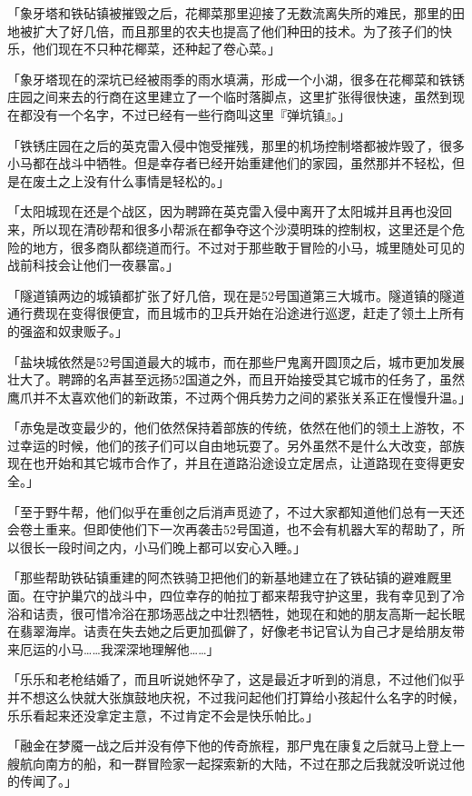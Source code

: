 {「象牙塔和铁砧镇被摧毁之后，花椰菜那里迎接了无数流离失所的难民，那里的田地被扩大了好几倍，而且那里的农夫也提高了他们种田的技术。为了孩子们的快乐，他们现在不只种花椰菜，还种起了卷心菜。」

「象牙塔现在的深坑已经被雨季的雨水填满，形成一个小湖，很多在花椰菜和铁锈庄园之间来去的行商在这里建立了一个临时落脚点，这里扩张得很快速，虽然到现在都没有一个名字，不过已经有一些行商叫这里『弹坑镇』。」

「铁锈庄园在之后的英克雷入侵中饱受摧残，那里的机场控制塔都被炸毁了，很多小马都在战斗中牺牲。但是幸存者已经开始重建他们的家园，虽然那并不轻松，但是在废土之上没有什么事情是轻松的。」

「太阳城现在还是个战区，因为聘蹄在英克雷入侵中离开了太阳城并且再也没回来，所以现在清砂帮和很多小帮派在都争夺这个沙漠明珠的控制权，这里还是个危险的地方，很多商队都绕道而行。不过对于那些敢于冒险的小马，城里随处可见的战前科技会让他们一夜暴富。」

「隧道镇两边的城镇都扩张了好几倍，现在是52号国道第三大城市。隧道镇的隧道通行费现在变得很便宜，而且城市的卫兵开始在沿途进行巡逻，赶走了领土上所有的强盗和奴隶贩子。」

「盐块城依然是52号国道最大的城市，而在那些尸鬼离开圆顶之后，城市更加发展壮大了。聘蹄的名声甚至远扬52国道之外，而且开始接受其它城市的任务了，虽然鹰爪并不太喜欢他们的新政策，不过两个佣兵势力之间的紧张关系正在慢慢升温。」

「赤兔是改变最少的，他们依然保持着部族的传统，依然在他们的领土上游牧，不过幸运的时候，他们的孩子们可以自由地玩耍了。另外虽然不是什么大改变，部族现在也开始和其它城市合作了，并且在道路沿途设立定居点，让道路现在变得更安全。」

「至于野牛帮，他们似乎在重创之后消声觅迹了，不过大家都知道他们总有一天还会卷土重来。但即使他们下一次再袭击52号国道，也不会有机器大军的帮助了，所以很长一段时间之内，小马们晚上都可以安心入睡。」

「那些帮助铁砧镇重建的阿杰铁骑卫把他们的新基地建立在了铁砧镇的避难厩里面。在守护巢穴的战斗中，四位幸存的帕拉丁都来帮我守护这里，我有幸见到了冷浴和诘责，很可惜冷浴在那场恶战之中壮烈牺牲，她现在和她的朋友高斯一起长眠在翡翠海岸。诘责在失去她之后更加孤僻了，好像老书记官认为自己才是给朋友带来厄运的小马……我深深地理解他……」

「乐乐和老枪结婚了，而且听说她怀孕了，这是最近才听到的消息，不过他们似乎并不想这么快就大张旗鼓地庆祝，不过我问起他们打算给小孩起什么名字的时候，乐乐看起来还没拿定主意，不过肯定不会是快乐帕比。」

「融金在梦魇一战之后并没有停下他的传奇旅程，那尸鬼在康复之后就马上登上一艘航向南方的船，和一群冒险家一起探索新的大陆，不过在那之后我就没听说过他的传闻了。」

}
